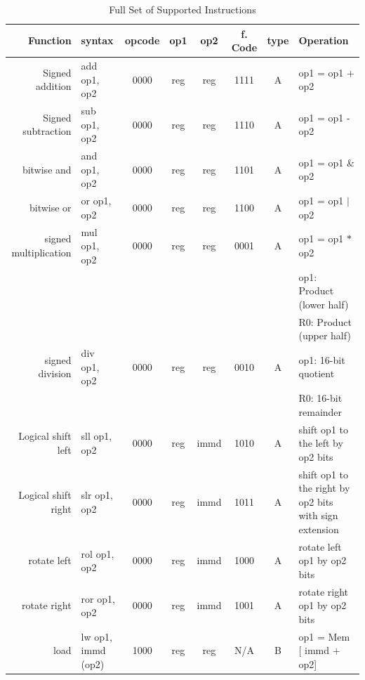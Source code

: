    \begin{table}[htbp]
        \caption{Full Set of Supported Instructions}
        \label{isa}
        \centering
        \begin{tabular}{r | l c c c c c p{5cm}}
            Function              & syntax             &opcode& op1   & op2    & f. Code & type   & Operation \\
            \hline
            Signed addition       & add op1, op2       & 0000 & reg  & reg    & 1111 & A & op1 = op1 $+$ op2 \\
            Signed subtraction    & sub op1, op2       & 0000 & reg  & reg    & 1110 & A & op1 = op1 - op2 \\
            bitwise and           & and op1, op2       & 0000 & reg  & reg    & 1101 & A & op1 = op1 \& op2 \\
            bitwise or            & or op1, op2        & 0000 & reg  & reg    & 1100 & A & op1 = op1 $|$ op2 \\
            signed multiplication & mul op1, op2       & 0000 & reg  & reg    & 0001 & A & op1 = op1 $*$ op2  \\
                                  &                    &      &      &        &      &   & op1: Product (lower half) \\
                                  &                    &      &      &        &      &   & R0: Product (upper half) \\
            signed division       & div op1, op2       & 0000 & reg  & reg    & 0010 & A & op1: 16-bit quotient \\
                                  &                    &      &      &        &      &   & R0: 16-bit remainder \\
            Logical shift left    & sll op1, op2       & 0000 & reg  & immd   & 1010 & A & shift op1 to the left by op2 bits \\
            Logical shift right   & slr op1, op2       & 0000 & reg  & immd   & 1011 & A & shift op1 to the right by op2 bits with sign extension \\
            rotate left           & rol op1, op2       & 0000 & reg  & immd   & 1000 & A & rotate left op1 by op2 bits \\
            rotate right          & ror op1, op2       & 0000 & reg  & immd   & 1001 & A & rotate right op1 by op2 bits \\
            \hline
            load                  & lw op1, immd (op2) & 1000 & reg  & reg    & N/A  & B & op1 = Mem [ immd + op2] \\

\end{tabular}
\end{table}
